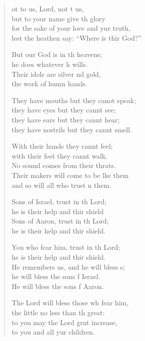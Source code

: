\settowidth{\versewidth}{for the sake of your love and your truth, *}
\begin{verse}%
  \begin{patverse}
ot to us, Lord, not t us,\Med\\
but to your name give th glory\\
for the sake of your love and yur truth,\Med\\
lest the heathen say: “Where is thir God?”

But our God is in th heavens;\Med\\
he does whatever h wills.\\
Their idols are silver nd gold,\Med\\
the work of humn hands.

They have mouths but they canot speak;\Med\\
they have eyes but they cannt see;\\
they have ears but they cannt hear;\Med\\
they have nostrils but they cannt smell.

With their hands they cannt feel;\Flex\\
with their feet they cannt walk.\Med\\
No sound comes from their thrats.\\
Their makers will come to be l\pointup{\i}ke them\Med\\
and so will all who trust \pointup{\i}n them.

Sons of Israel, trust in th Lord;\Med\\
he is their help and thir shield\\
Sons of Aaron, trust in th Lord;\Med\\
he is their help and thir shield.

You who fear him, trust in th Lord;\Med\\
he is their help and thir shield.\\
He remembers us, and he will bless s;\Flex\\
he will bless the sons f Israel.\Med\\
He will bless the sons f Aaron.

The Lord will bless those wh fear him,\Med\\
the little no less than th great:\\
to you may the Lord grnt increase,\Med\\
to you and all yur children.


\end{patverse}
\end{verse}

